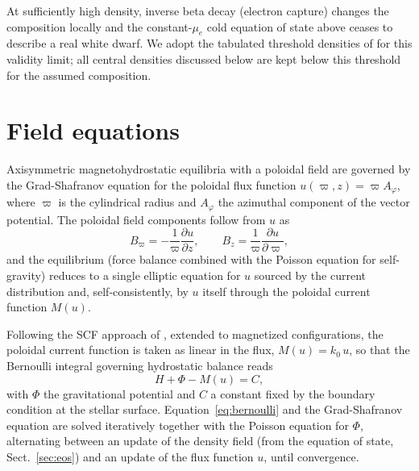 \documentclass{aa}
\begin{document}
At sufficiently high density, inverse beta decay (electron capture)
changes the composition locally and the constant-$\mu_e$ cold equation
of state above ceases to describe a real white dwarf. We adopt the
tabulated threshold densities of \citet{boshkayev2013} for this
validity limit; all central densities discussed below are kept below
this threshold for the assumed composition.


\section{Field equations}
\label{sec:field-eq}

Axisymmetric magnetohydrostatic equilibria with a poloidal field are
governed by the Grad-Shafranov equation \citep{grad1958,shafranov1966}
for the poloidal flux function $u(\varpi,z) = \varpi A_\varphi$, where
$\varpi$ is the cylindrical radius and $A_\varphi$ the azimuthal
component of the vector potential. The poloidal field components follow
from $u$ as
\begin{equation}
B_\varpi = -\frac{1}{\varpi}\frac{\partial u}{\partial z}, \qquad
B_z = \frac{1}{\varpi}\frac{\partial u}{\partial \varpi},
\end{equation}
and the equilibrium (force balance combined with the Poisson equation
for self-gravity) reduces to a single elliptic equation for $u$ sourced
by the current distribution and, self-consistently, by $u$ itself
through the poloidal current function $M(u)$.

Following the SCF approach of \citet{hachisu1986}, extended to
magnetized configurations, the poloidal current function is taken as
linear in the flux, $M(u) = k_0\,u$, so that the Bernoulli integral
governing hydrostatic balance reads
\begin{equation}
H + \Phi - M(u) = C,
\label{eq:bernoulli}
\end{equation}
with $\Phi$ the gravitational potential and $C$ a constant fixed by the
boundary condition at the stellar surface. Equation~\ref{eq:bernoulli}
and the Grad-Shafranov equation are solved iteratively together with
the Poisson equation for $\Phi$, alternating between an update of the
density field (from the equation of state, Sect.~\ref{sec:eos}) and an
update of the flux function $u$, until convergence.
\end{document}
